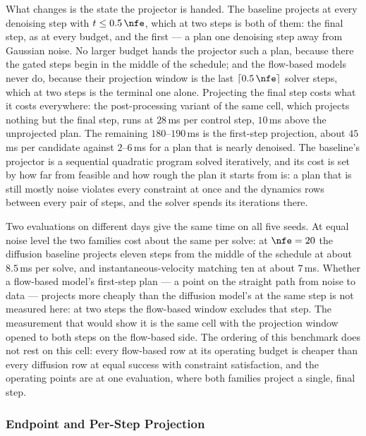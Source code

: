 What changes is the state the projector is handed. The baseline projects at every denoising step with
$t \le 0.5\,\nfe$, which at two steps is both of them: the final step, as at every budget, and the first
--- a plan one denoising step away from Gaussian noise. No larger budget hands the projector such a plan,
because there the gated steps begin in the middle of the schedule; and the flow-based models never do,
because their projection window is the last $\lceil 0.5\,\nfe \rceil$ solver steps, which at two steps
is the terminal one alone. Projecting the final step costs what it costs everywhere: the post-processing
variant of the same cell, which projects nothing but the final step, runs at $28$\,ms per control step,
$10$\,ms above the unprojected plan. The remaining $180$--$190$\,ms is the first-step projection,
about $45$\,ms per candidate against $2$--$6$\,ms for a plan that is nearly denoised. The baseline's
projector is a sequential quadratic program solved iteratively, and its cost is set by how far from
feasible and how rough the plan it starts from is: a plan that is still mostly noise violates every
constraint at once and the dynamics rows between every pair of steps, and the solver spends its
iterations there.

Two evaluations on different days give the same time on all five seeds. At equal noise level the two
families cost about the same per solve: at $\nfe=20$ the diffusion baseline projects eleven steps from
the middle of the schedule at about $8.5$\,ms per solve, and instantaneous-velocity matching ten at about
$7$\,ms. Whether a flow-based model's first-step plan --- a point on the straight path from noise to
data --- projects more cheaply than the diffusion model's at the same step is not measured here: at two
steps the flow-based window excludes that step. The measurement that would show it is the same cell with
the projection window opened to both steps on the flow-based side.
The ordering of this benchmark does not rest on this cell: every flow-based row at its operating budget is cheaper
than every diffusion row at equal success with constraint satisfaction, and the operating points are at one
evaluation, where both families project a single, final step.

\subsubsection{Endpoint and Per-Step Projection}\label{sec:res:avoiding:projectors}

